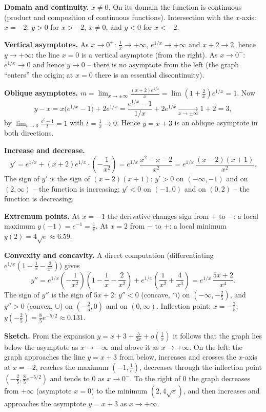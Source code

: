 \begin{solution}
\textbf{Domain and continuity.} $x\neq0$. On its domain the function is continuous (product and composition of continuous functions). Intersection with the $x$-axis: $x=-2$; $y>0$ for $x>-2$, $x\ne0$, and $y<0$ for $x<-2$.

\textbf{Vertical asymptotes.} As $x\to0^+$: $\frac1x\to+\infty$, $e^{1/x}\to+\infty$ and $x+2\to2$, hence $y\to+\infty$: the line $x=0$ is a vertical asymptote (from the right). As $x\to0^-$: $e^{1/x}\to0$ and hence $y\to0$ -- there is no asymptote from the left (the graph ``enters'' the origin; at $x=0$ there is an essential discontinuity).

\textbf{Oblique asymptotes.} $m=\lim_{x\to\pm\infty}\frac{(x+2)e^{1/x}}{x}=\lim\left(1+\frac2x\right)e^{1/x}=1$. Now
\[ y-x=x\big(e^{1/x}-1\big)+2e^{1/x}=\frac{e^{1/x}-1}{1/x}+2e^{1/x}\xrightarrow[x\to\pm\infty]{}1+2=3, \]
by $\lim_{t\to0}\frac{e^t-1}{t}=1$ with $t=\frac1x\to0$. Hence $y=x+3$ is an oblique asymptote in both directions.

\textbf{Increase and decrease.}
\[ y'=e^{1/x}+(x+2)e^{1/x}\cdot\left(-\frac1{x^2}\right)=e^{1/x}\,\frac{x^2-x-2}{x^2}=e^{1/x}\,\frac{(x-2)(x+1)}{x^2}. \]
The sign of $y'$ is the sign of $(x-2)(x+1)$: $y'>0$ on $(-\infty,-1)$ and on $(2,\infty)$ -- the function is increasing; $y'<0$ on $(-1,0)$ and on $(0,2)$ -- the function is decreasing.

\textbf{Extremum points.} At $x=-1$ the derivative changes sign from $+$ to $-$: a local maximum $y(-1)=e^{-1}=\frac1e$. At $x=2$ from $-$ to $+$: a local minimum $y(2)=4\sqrt e\approx6.59$.

\textbf{Convexity and concavity.} A direct computation (differentiating $e^{1/x}(1-\frac1x-\frac2{x^2})$) gives
\[ y''=e^{1/x}\left(-\frac1{x^2}\right)\left(1-\frac1x-\frac2{x^2}\right)+e^{1/x}\left(\frac1{x^2}+\frac4{x^3}\right)=e^{1/x}\,\frac{5x+2}{x^4}. \]
The sign of $y''$ is the sign of $5x+2$: $y''<0$ (concave, $\cap$) on $(-\infty,-\frac25)$, and $y''>0$ (convex, $\cup$) on $(-\frac25,0)$ and on $(0,\infty)$. Inflection point: $x=-\frac25$, $y\left(-\frac25\right)=\frac85e^{-5/2}\approx0.131$.

\textbf{Sketch.} From the expansion $y=x+3+\frac{5}{2x}+o\!\left(\frac1x\right)$ it follows that the graph lies below the asymptote as $x\to-\infty$ and above it as $x\to+\infty$. On the left: the graph approaches the line $y=x+3$ from below, increases and crosses the $x$-axis at $x=-2$, reaches the maximum $(-1,\frac1e)$, decreases through the inflection point $(-\frac25,\frac85e^{-5/2})$ and tends to $0$ as $x\to0^-$. To the right of $0$ the graph decreases from $+\infty$ (asymptote $x=0$) to the minimum $(2,4\sqrt e)$, and then increases and approaches the asymptote $y=x+3$ as $x\to+\infty$.
\end{solution}
